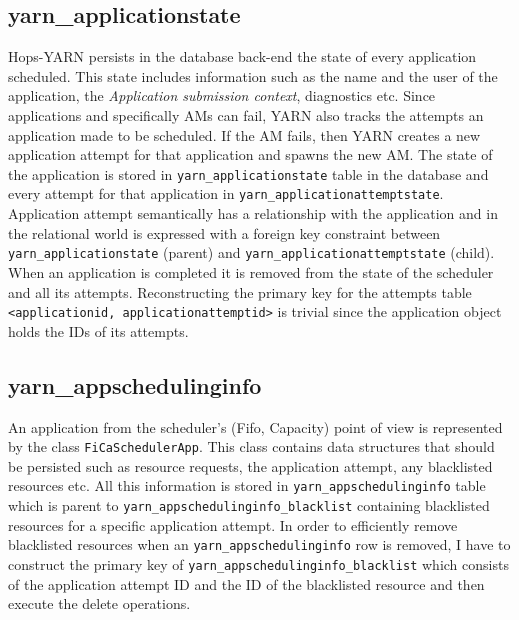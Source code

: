 \subsection{yarn\_applicationstate}
\label{ssec:impl_fk_appstate}
Hops-YARN persists in the database back-end the state of every
application scheduled. This state includes information such as the
name and the user of the application, the \emph{Application submission
  context}, diagnostics etc. Since applications and specifically AMs
can fail, YARN also tracks the attempts an application made to be scheduled.
If the AM fails, then YARN creates a new application attempt
for that application and spawns the new AM. The state of the
application is stored in \texttt{yarn\_applicationstate} table in the
database and every attempt for that application in
\texttt{yarn\_applicationattemptstate}. Application attempt
semantically has a relationship with the application and in the
relational world is expressed with a foreign key constraint
between \texttt{yarn\_applicationstate} (parent) and
\texttt{yarn\_applicationattemptstate} (child). When an application
is completed it is removed from the state of the scheduler and all
its attempts. Reconstructing the primary key for the attempts table
\texttt{<applicationid, applicationattemptid>} is trivial since the
application object holds the IDs of its attempts.

\subsection{yarn\_appschedulinginfo}
\label{ssec:impl_fk_appschedulinginfo}
An application from the scheduler's (Fifo, Capacity) point of view is
represented by the class \texttt{FiCaSchedulerApp}. This class
contains data structures that should be persisted such as resource
requests, the application attempt, any blacklisted resources etc. All
this information is stored in \texttt{yarn\_appschedulinginfo} table
which is parent to \texttt{yarn\_appschedulinginfo\_blacklist}
containing blacklisted resources for a specific application
attempt. In order to efficiently remove blacklisted resources when an
\texttt{yarn\_appschedulinginfo} row is removed, I have to construct
the primary key of \texttt{yarn\_appschedulinginfo\_blacklist} which
consists of the application attempt ID and the ID of the blacklisted
resource and then execute the delete operations.


